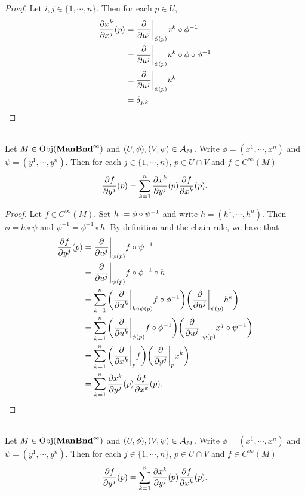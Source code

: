 \documentclass{book}
\begin{document}
\begin{proof}
	Let $i,j \in \{1, \cdots, n\}$. Then for each $p \in U$,
	\begin{align*}
		\frac{\partial x^k}{\partial x^j} (p) 
		& =  \frac{\partial}{\partial u^j} \bigg|_{\phi(p)} x^k \circ \phi^{-1} \\
		& = \frac{\partial}{\partial u^j} \bigg|_{\phi(p)} u^k \circ \phi \circ \phi^{-1} \\
		& = \frac{\partial}{\partial u^j} \bigg|_{\phi(p)} u^k  \\
		& = \delta_{j, k}
	\end{align*}
\end{proof}

\begin{ex}  \\
	Let $M \in \operatorname{Obj}(\operatorname*{\text{\textbf{ManBnd}}^{\infty}})$ and $(U, \phi), (V, \psi) \in \mathcal{A}_M$. Write $\phi = (x^1, \cdots, x^n)$ and $\psi = (y^1, \cdots, y^n)$. Then for each $j \in \{1, \cdots, n\}$, $p \in U \cap V$ and $f \in C^{\infty}(M)$ 
	$$\frac{\partial f}{\partial y^j}(p) = \sum_{k =1}^n \frac{\partial x^k}{\partial y^j}(p)  \frac{\partial f}{\partial x^k}(p).$$
\end{ex}

\begin{proof}
	Let $f \in C^{\infty}(M)$. Set $h \vcentcolon= \phi \circ \psi^{-1}$ and write $h = (h^1, \cdots, h^n)$. Then $\phi = h \circ \psi$ and $\psi^{-1} = \phi^{-1} \circ h$. By definition and the chain rule, we have that 
	\begin{align*}
		\frac{\partial f}{\partial y^j} (p) 
		& = \frac{\partial}{\partial u^j} \bigg|_{\psi(p)} f \circ \psi^{-1} \\
		& = \frac{\partial}{\partial u^j} \bigg|_{\psi(p)} f \circ \phi^{-1} \circ h \\
		& = \sum_{k=1}^n \bigg(\frac{\partial}{\partial u^k} \bigg|_{h \circ \psi (p)} f \circ \phi^{-1} \bigg)  \bigg( \frac{\partial}{\partial u^j} \bigg|_{\psi(p)} h^k \bigg) \\
		& = \sum_{k=1}^n \bigg(\frac{\partial}{\partial u^k} \bigg|_{\phi (p)} f \circ \phi^{-1}  \bigg) \bigg( \frac{\partial}{\partial u^j} \bigg|_{\psi(p)} x^j \circ \psi^{-1} \bigg) \\
		& = \sum_{k=1}^n \bigg( \frac{\partial}{\partial x^k} \bigg|_p f \bigg)  \bigg(   \frac{\partial}{\partial y^j} \bigg|_p x^k  \bigg)\\
		& = \sum_{k =1}^n \frac{\partial x^k}{\partial y^j}(p)  \frac{\partial f}{\partial x^k}(p).
	\end{align*}
\end{proof}

\begin{ex}  \\
	Let $M \in \operatorname{Obj}(\operatorname*{\text{\textbf{ManBnd}}^{\infty}})$ and $(U, \phi), (V, \psi) \in \mathcal{A}_M$. Write $\phi = (x^1, \cdots, x^n)$ and $\psi = (y^1, \cdots, y^n)$. Then for each $j \in \{1, \cdots, n\}$, $p \in U \cap V$ and $f \in C^{\infty}(M)$ 
	$$\frac{\partial f}{\partial y^j}(p) = \sum_{k =1}^n \frac{\partial x^k}{\partial y^j}(p)  \frac{\partial f}{\partial x^k}(p).$$
\end{ex}
\end{document}
